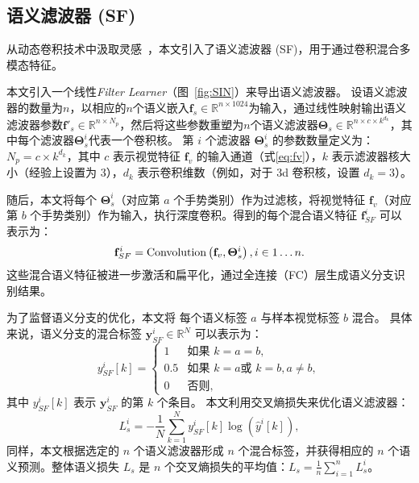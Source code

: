 \subsection{语义滤波器 (SF)}
从动态卷积技术中汲取灵感~\cite{yang2019condconv,chen2020dynamic}，本文引入了语义滤波器 (SF)，用于通过卷积混合多模态特征。%

本文引入一个线性\emph{Filter Learner}（图~\ref{fig:SIN}）来导出语义滤波器。
设语义滤波器的数量为$n$，以相应的$n$个语义嵌入$\mathbf{f}_{s} \in \mathbb{R}^{n\times 1024}$为输入，通过线性映射输出语义滤波器参数$\mathbf{f'}_{s}\in \mathbb{R}^{n\times N_p}$，然后将这些参数重塑为$n$个语义滤波器$\boldsymbol{\Theta}_{s}\in \mathbb{R}^{n\times c\times k^{d_k}}$，其中每个滤波器$\boldsymbol{\Theta}_{s}^i$代表一个卷积核。
第 $i$ 个滤波器 $\boldsymbol{\Theta}_{s}^i$ 的参数数量定义为：$N_p=c\times k^{d_k}$，其中 $c$ 表示视觉特征 $\mathbf{f}_{v}$ 的输入通道（式\eqref{eq:fv}），$k$ 表示滤波器核大小（经验上设置为 3），$d_k$ 表示卷积维数（例如，对于 3d 卷积核，设置 $d_k=3$）。

随后，本文将每个 $\boldsymbol{\Theta}_{s}^i$（对应第 $a$ 个手势类别）作为过滤核，将视觉特征 $\mathbf{f}_{v}$（对应第 $b$ 个手势类别）作为输入，执行深度卷积。得到的每个混合语义特征 $\mathbf{f}_{SF}^i$ 可以表示为：
\begin{equation}
\mathbf{f}_{SF}^{i} = \text{Convolution}\left(\mathbf{f}_{v}, \boldsymbol{\Theta}_{s}^i\right),\quad i \in 1\dots n. \\
\end{equation}
这些混合语义特征被进一步激活和扁平化，通过全连接（FC）层生成语义分支识别结果。

为了监督语义分支的优化，本文将 \cite{zuo2023natural} 每个语义标签 $a$ 与样本视觉标签 $b$ 混合。
具体来说，语义分支的混合标签 $\mathbf{y}_{SF}^i \in \mathbb{R}^N$ 可以表示为：
\begin{equation}
y_{SF}^i[k] = \begin{cases}
1 & \text{如果 } k = a = b,\\
0.5 & \text{如果 } k = a \text{或 } k = b, a\neq b,\\
0 & \text{否则,}
\end{cases}
\end{equation}
其中 $y_{SF}^i[k]$ 表示 $\mathbf{y}_{SF}^i$ 的第 $k$ 个条目。
本文利用交叉熵损失来优化语义滤波器：
\begin{equation}
L_{s}^i = -\frac{1}{N}\sum_{k=1}^{N}{{y}_{SF}^i[k] \log\left(\hat{y}^i[k]\right)},
\end{equation}
同样，本文根据选定的 $n$ 个语义滤波器形成 $n$ 个混合标签，并获得相应的 $n$ 个语义预测。整体语义损失 $L_{s}$ 是 $n$ 个交叉熵损失的平均值：$L_{s} = \frac{1}{n}\sum_{i=1}^{n}{L_{s}^i}$。

